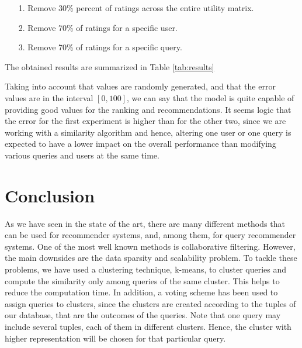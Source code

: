 \documentclass[sigconf]{acmart}
\begin{document}
\begin{itemize}
    \item[1.] Remove 30\% percent of ratings across the entire utility matrix. 
    \item[2.] Remove 70\% of ratings for a specific user.
    \item[3.] Remove 70\% of ratings for a specific query.
\end{itemize}
The obtained results are summarized in Table \ref{tab:results}
\begin{table}[H]
    \centering
    \caption{Average error for each of the experiments. Values between 0 and 100.}
    \label{tab:results}
\end{table}
Taking into account that values are randomly generated, and that the error values are in the interval $[0,100]$, we can say that the model is quite capable of providing good values for the ranking and recommendations. It seems logic that the error for the first experiment is higher than for the other two, since we are working with a similarity algorithm and hence, altering one user or one query is expected to have a lower impact on the overall performance than modifying various queries and users at the same time.

\section{Conclusion}
As we have seen in the state of the art, there are many different methods that can be used for recommender systems, and, among them, for query recommender systems. One of the most well known methods is collaborative filtering. However, the main downsides are the data sparsity and scalability problem. To tackle these problems, we have used a clustering technique, k-means, to cluster queries and compute the similarity only among queries of the same cluster. This helps to reduce the computation time. In addition, a voting scheme has been used to assign queries to clusters, since the clusters are created according to the tuples of our database, that are the outcomes of the queries. Note that one query may include several tuples, each of them in different clusters. Hence, the cluster with higher representation will be chosen for that particular query.
\end{document}

